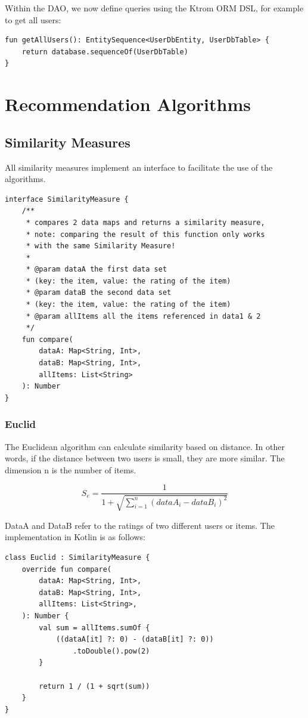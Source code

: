 Within the DAO, we now define queries using the Ktrom ORM DSL, for example to get all users:

\begin{verbatim}
fun getAllUsers(): EntitySequence<UserDbEntity, UserDbTable> {
    return database.sequenceOf(UserDbTable)
}
\end{verbatim}

\section{Recommendation Algorithms}

\subsection{Similarity Measures}

All similarity measures implement an interface to facilitate the use of the algorithms.

\begin{verbatim}
interface SimilarityMeasure {
    /**
     * compares 2 data maps and returns a similarity measure,
     * note: comparing the result of this function only works 
     * with the same Similarity Measure!
     *
     * @param dataA the first data set
     * (key: the item, value: the rating of the item)
     * @param dataB the second data set
     * (key: the item, value: the rating of the item)
     * @param allItems all the items referenced in data1 & 2
     */
    fun compare(
        dataA: Map<String, Int>,
        dataB: Map<String, Int>,
        allItems: List<String>
    ): Number
}
\end{verbatim}

\subsubsection{Euclid}

The Euclidean algorithm can calculate similarity based on distance. In other words, if the distance between two users is small, they are more similar. The dimension n is the number of items.

\begin{equation}
S_{e} = \frac{1}{1+\sqrt{\sum_{i=1}^{n}{(dataA_i - dataB_i)^2}}}
\label{euklid}
\end{equation}

DataA and DataB refer to the ratings of two different users or items.
The implementation in Kotlin is as follows:

\begin{verbatim}
class Euclid : SimilarityMeasure {
    override fun compare(
        dataA: Map<String, Int>,
        dataB: Map<String, Int>,
        allItems: List<String>,
    ): Number {
        val sum = allItems.sumOf {
            ((dataA[it] ?: 0) - (dataB[it] ?: 0))
                .toDouble().pow(2)
        }

        return 1 / (1 + sqrt(sum))
    }
}
\end{verbatim}

